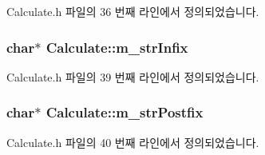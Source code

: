 Calculate.\+h 파일의 36 번째 라인에서 정의되었습니다.

\hypertarget{class_calculate_a1b964b49f9a186fa02643c1361ccd4ab}{
\subsubsection[{m\+\_\+str\+Infix}]{\setlength{\rightskip}{0pt plus 5cm}char$\ast$ Calculate\+::m\+\_\+str\+Infix\hspace{0.3cm}{\ttfamily [protected]}}}\label{class_calculate_a1b964b49f9a186fa02643c1361ccd4ab}


Calculate.\+h 파일의 39 번째 라인에서 정의되었습니다.

\hypertarget{class_calculate_aceafe6d40cd154f9535dc971c1e9bb7a}{
\subsubsection[{m\+\_\+str\+Postfix}]{\setlength{\rightskip}{0pt plus 5cm}char$\ast$ Calculate\+::m\+\_\+str\+Postfix\hspace{0.3cm}{\ttfamily [protected]}}}\label{class_calculate_aceafe6d40cd154f9535dc971c1e9bb7a}


Calculate.\+h 파일의 40 번째 라인에서 정의되었습니다.

